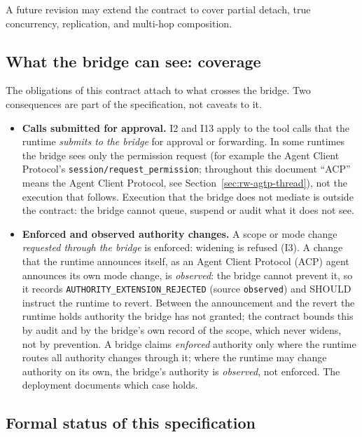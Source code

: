 A future revision may extend the contract to cover partial detach,
true concurrency, replication, and multi-hop composition.

\subsection{What the bridge can see: coverage}\label{sec:coverage}

The obligations of this contract attach to what crosses the bridge.
Two consequences are part of the specification, not caveats to it.
\begin{itemize}[leftmargin=2em]
\item \textbf{Calls submitted for approval.} I2 and I13 apply to the
tool calls that the runtime \emph{submits to the bridge} for approval or
forwarding. In some runtimes the bridge sees only the permission request
(for example the Agent Client Protocol's
\texttt{session/request\_permission}; throughout this document ``ACP''
means the Agent Client Protocol, see Section~\ref{sec:rw-agtp-thread}), not the
execution that follows. Execution that the bridge does not mediate is
outside the contract: the bridge cannot queue, suspend or audit what it
does not see.
\item \textbf{Enforced and observed authority changes.} A scope or mode
change \emph{requested through the bridge} is enforced: widening is
refused (I3). A change that the runtime announces itself, as an Agent
Client Protocol (ACP) agent announces its own mode change, is
\emph{observed}: the bridge
cannot prevent it, so it records \texttt{AUTHORITY\_EXTENSION\_REJECTED}
(source \texttt{observed}) and SHOULD instruct the runtime to revert.
Between the announcement and the revert the runtime holds authority the
bridge has not granted; the contract bounds this by audit and by the
bridge's own record of the scope, which never widens, not by prevention.
A bridge claims \emph{enforced} authority only where the runtime routes
all authority changes through it; where the runtime may change authority
on its own, the bridge's authority is \emph{observed}, not enforced.
The deployment documents which case holds.
\end{itemize}

\subsection{Formal status of this specification}\label{sec:formal-status}

